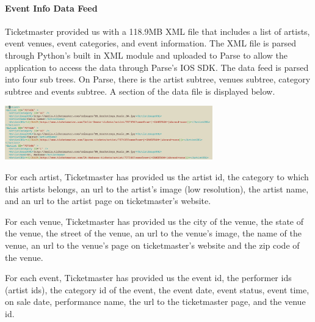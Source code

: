		       \paragraph{Event Info Data Feed}
		       Ticketmaster provided us with a 118.9MB XML file that includes a list of artists, event venues, event 
		       categories, and event information. The XML file is parsed through Python’s built in XML module and 
		       uploaded to Parse to allow the application to access the data through Parse’s IOS SDK. The data feed 
		       is parsed into four sub trees. On Parse, there is the artist subtree, venues subtree, category subtree 
		       and events subtree. A section of the data file is displayed below. 
		       	\begin{center}
		       		\includegraphics[width=90mm]{./pics/xml1.png}
		       	\end{center}
		       	For each artist, Ticketmaster has provided us the artist id, the category to which this artists 
		       	belongs, an url to the artist’s image (low resolution), the artist name, and an url to the artist page 
		       	on ticketmaster’s website.
		       	
		       	For each venue, Ticketmaster has provided us the city of the venue, the state of the venue, the 
		       	street of the venue, an url to the venue’s image, the name of the venue, an url to the venue’s page 
		       	on ticketmaster’s website and the zip code of the venue.
		       	
		       	For each event, Ticketmaster has provided us the event id, the performer ids (artist ids), the 
		       	category id of the event, the event date, event status, event time, on sale date, performance name, 
		       	the url to the ticketmaster page, and the venue id.
		       	
